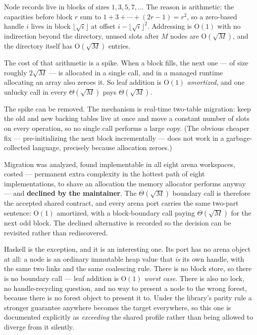 \documentclass[11pt,twoside,openright]{book}
\newcommand{\bigoh}[1]{$\mathrm{O}(#1)$}
\begin{document}
Node records live in blocks of sizes $1, 3, 5, 7, \dots$ The reason is
arithmetic: the capacities before block $r$ sum to
$1 + 3 + \cdots + (2r-1) = r^2$, so a zero-based handle $i$ lives in block
$\lfloor\sqrt{i}\rfloor$ at offset $i - \lfloor\sqrt{i}\rfloor^2$. Addressing is
\bigoh{1} with no indirection beyond the directory, unused slots after $M$ nodes
are \bigoh{\sqrt{M}}, and the directory itself has \bigoh{\sqrt{M}}
entries.

The cost of that arithmetic is a spike. When a block fills, the next one --- of
size roughly $2\sqrt{M}$ --- is allocated in a single call, and in a managed
runtime allocating an array also zeroes it. So leaf addition is \bigoh{1}
\emph{amortized}, and one unlucky call in every $\Theta(\sqrt{M})$ pays
$\Theta(\sqrt{M})$.

\begin{caveatbox}
The spike can be removed. The mechanism is real-time two-table migration: keep
the old and new backing tables live at once and move a constant number of slots
on every operation, so no single call performs a large copy. (The obvious
cheaper fix --- pre-initializing the next block incrementally --- does not work
in a garbage-collected language, precisely because allocation zeroes.)

Migration was analyzed, found implementable in all eight arena workspaces,
costed --- permanent extra complexity in the hottest path of eight
implementations, to shave an allocation the memory allocator performs anyway ---
and \textbf{declined by the maintainer}. The $\Theta(\sqrt{M})$ boundary call is
therefore the accepted shared contract, and every arena port carries the same
two-part sentence: \bigoh{1} amortized, with a block-boundary call paying
$\Theta(\sqrt{M})$ for the next odd block. The declined alternative is recorded
so the decision can be revisited rather than rediscovered.
\end{caveatbox}

Haskell is the exception, and it is an interesting one. Its port has no arena
object at all: a node is an ordinary immutable heap value that \emph{is} its own
handle, with the same two links and the same coalescing rule. There is no block
store, so there is no boundary call --- leaf addition is \bigoh{1} \emph{worst
case}. There is also no lock, no handle-recycling question, and no way to
present a node to the wrong forest, because there is no forest object to present
it to. Under the library's parity rule a stronger guarantee anywhere becomes the
target everywhere, so this one is documented explicitly as \emph{exceeding} the
shared profile rather than being allowed to diverge from it silently.
\end{document}
